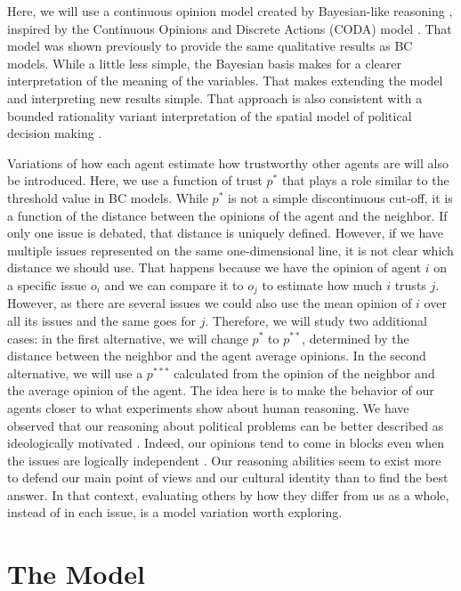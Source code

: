 \documentclass{article}
\begin{document}
Here, we will use a continuous opinion model created by Bayesian-like reasoning
\cite{martins08c}, inspired by the Continuous Opinions and Discrete Actions
(CODA) model \cite{martins08a,martins12b}. That model was shown previously
\cite{martins08c} to provide the same qualitative results as BC models. While a
little less simple, the Bayesian basis makes for a clearer interpretation of the
meaning of the variables. That makes extending the model and interpreting new
results simple. That approach is also consistent with a bounded rationality
variant interpretation of the spatial model of political decision making
\cite{humphreys2010spatial,ostrom1998behavioral}.

Variations of how each agent estimate how trustworthy other agents are will also
be introduced. Here, we use a function of trust $p^*$ that plays a role similar
to the threshold value in BC models. While $p^*$ is not a simple discontinuous
cut-off, it is a function of the distance between the opinions of the agent and
the neighbor. If only one issue is debated, that distance is uniquely defined.
However, if we have multiple issues represented on the same one-dimensional
line, it is not clear which distance we should use. That happens because we have
the opinion of agent $i$ on a specific issue $o_i$ and we can compare it to
$o_j$ to estimate how much $i$ trusts $j$. However, as there are several issues
we could also use the mean opinion of $i$ over all its issues and the same goes
for $j$. Therefore, we will study two additional cases: in the first
alternative, we will change \(p^*\) to \(p^{**}\), determined by the distance
between the neighbor and the agent average opinions. In the second alternative,
we will use a \(p^{***}\) calculated from the opinion of the neighbor and the
average opinion of the agent. The idea here is to make the behavior of our
agents closer to what experiments show about human reasoning. We have observed
that our reasoning about political problems can be better described as
ideologically motivated \cite{jostetal03a,taberlodge06a,Claassen2015a}. Indeed,
our opinions tend to come in blocks even when the issues are logically
independent \cite{jervis76a}. Our reasoning abilities seem to exist more to
defend our main point of views \cite{mercier11a,merciersperber11a} and our
cultural identity \cite{kahanetal11} than to find the best answer. In that
context, evaluating others by how they differ from us as a whole, instead of in
each issue, is a model variation worth exploring.
 
\section{The Model}
\end{document}
